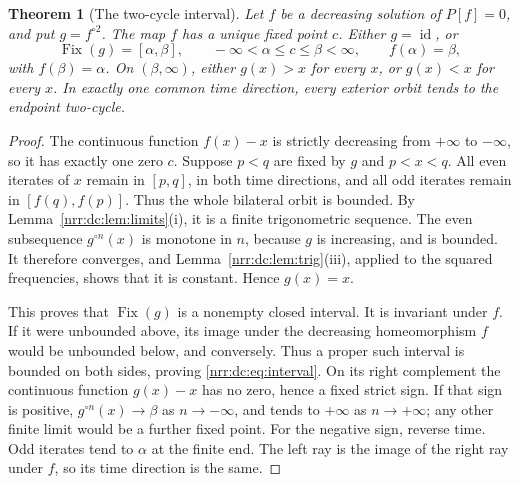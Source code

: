 \documentclass[11pt,letterpaper]{article}
\newtheorem{theorem}{Theorem}[section]
\theoremstyle{definition}
\theoremstyle{remark}
\newcommand{\id}{\operatorname{id}}
\DeclareMathOperator{\Fix}{Fix}
\begin{document}
\begin{theorem}[The two-cycle interval]
\label{nrr:dc:thm:interval}
Let $f$ be a decreasing solution of $P[f]=0$, and put $g=f^{\circ2}$.
The map $f$ has a unique fixed point $c$. Either $g=\id$, or
\begin{equation}
 \Fix(g)=[\alpha,\beta],\qquad
 -\infty<\alpha\le c\le\beta<\infty,
 \qquad f(\alpha)=\beta,
 \label{nrr:dc:eq:interval}
\end{equation}
with $f(\beta)=\alpha$. On $(\beta,\infty)$, either $g(x)>x$ for every
$x$, or $g(x)<x$ for every $x$. In exactly one common time direction,
every exterior orbit tends to the endpoint two-cycle.
\end{theorem}
\begin{proof}
The continuous function $f(x)-x$ is strictly decreasing from $+\infty$
to $-\infty$, so it has exactly one zero $c$.
Suppose $p<q$ are fixed by $g$ and $p<x<q$. All even iterates of $x$
remain in $[p,q]$, in both time directions, and all odd iterates remain
in $[f(q),f(p)]$. Thus the whole bilateral orbit is bounded.
By Lemma~\ref{nrr:dc:lem:limits}(i), it is a finite trigonometric sequence.
The even subsequence $g^{\circ n}(x)$ is monotone in $n$, because $g$
is increasing, and is bounded. It therefore converges, and
Lemma~\ref{nrr:dc:lem:trig}(iii), applied to the squared frequencies, shows
that it is constant. Hence $g(x)=x$.

This proves that $\Fix(g)$ is a nonempty closed interval. It is invariant
under $f$. If it were unbounded above, its image under the decreasing
homeomorphism $f$ would be unbounded below, and conversely. Thus a
proper such interval is bounded on both sides, proving
\eqref{nrr:dc:eq:interval}. On its right complement the continuous function
$g(x)-x$ has no zero, hence a fixed strict sign. If that sign is positive,
$g^{\circ n}(x)\to\beta$ as $n\to-\infty$, and tends to $+\infty$
as $n\to+\infty$; any other finite limit would be a further fixed point.
For the negative sign, reverse time. Odd iterates tend to $\alpha$
at the finite end. The left ray is the image of the right ray under
$f$, so its time direction is the same.
\end{proof}
\end{document}
